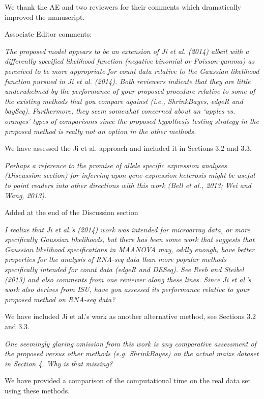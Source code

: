\documentclass{article}
\newcommand{\comment}[1]{\textit{#1}}
\newcommand{\response}[1]{#1}
\begin{document}
\response{We thank the AE and two reviewers for their comments which dramatically improved the manuscript.}

Associate Editor comments:

\comment{The proposed model appears to be an extension of Ji et al. (2014) albeit with a differently specified likelihood function (negative binomial or Poisson-gamma) as perceived to be more appropriate for count data relative to the Gaussian likelihood function pursued in Ji et al. (2014). Both reviewers indicate that they are little underwhelmed by the performance of your proposed procedure relative to some of the existing methods that you compare against (i.e., ShrinkBayes, edgeR and baySeq).  Furthermore, they seem somewhat concerned about an ‘apples vs. oranges’ types of comparisons since the proposed hypothesis testing strategy in the proposed method is really not an option in the other methods.}

\response{We have assessed the Ji et al. approach and included it in Sections 3.2 and 3.3.}

\comment{Perhaps a reference to the promise of allele specific expression analyses (Discussion section) for inferring upon gene-expression heterosis might be useful to point readers into other directions with this work (Bell et al., 2013; Wei and Wang, 2013).}

\response{Added at the end of the Discussion section}

\comment{I realize that Ji et al.’s (2014) work was intended for microarray data, or more specifically Gaussian likelihoods, but there has been some work that suggests that Gaussian likelihood specifications in MAANOVA may, oddly enough, have better properties for the analysis of RNA-seq data than more popular methods specifically intended for count data (edgeR and DESeq).  See Reeb and Steibel (2013) and also comments from one reviewer along these lines.  Since Ji et al.’s work also derives from ISU, have you assessed its performance relative to your proposed method on RNA-seq data?}

\response{We have included Ji et al.'s work as another alternative method, see Sections 3.2 and 3.3.} 

\comment{One seemingly glaring omission from this work is any comparative assessment of the proposed versus other methods (e.g. ShrinkBayes) on the actual maize dataset in Section 4.  Why is that missing?}

\response{We have provided a comparison of the computational time on the real data set using these methods.}
\end{document}
